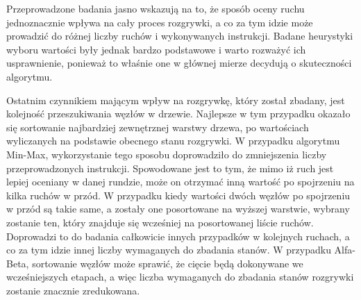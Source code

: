 \documentclass[a4paper,10pt]{article}
\begin{document}
    Przeprowadzone badania jasno wskazują na to, że sposób oceny ruchu jednoznacznie wpływa na cały proces rozgrywki, a co za tym idzie może prowadzić do różnej liczby ruchów i wykonywanych instrukcji. Badane heurystyki wyboru wartości były jednak bardzo podstawowe i warto rozważyć ich usprawnienie, ponieważ to właśnie one w głównej mierze decydują o skuteczności algorytmu.
    
    Ostatnim czynnikiem mającym wpływ na rozgrywkę, który został zbadany, jest kolejność przeszukiwania węzłów w drzewie. Najlepsze w tym przypadku okazało się sortowanie najbardziej zewnętrznej warstwy drzewa, po wartościach wyliczanych na podstawie obecnego stanu rozgrywki. W przypadku algorytmu Min-Max, wykorzystanie tego sposobu doprowadziło do zmniejszenia liczby przeprowadzonych instrukcji. Spowodowane jest to tym, że mimo iż ruch jest lepiej oceniany w danej rundzie, może on otrzymać inną wartość po spojrzeniu na kilka ruchów w przód. W przypadku kiedy wartości dwóch węzłów po spojrzeniu w przód są takie same, a zostały one posortowane na wyższej warstwie, wybrany zostanie ten, który znajduje się wcześniej na posortowanej liście ruchów. Doprowadzi to do badania całkowicie innych przypadków w kolejnych ruchach, a co za tym idzie innej liczby wymaganych do zbadania stanów. W przypadku Alfa-Beta, sortowanie węzłów może sprawić, że cięcie będą dokonywane we wcześniejszych etapach, a więc liczba wymaganych do zbadania stanów rozgrywki zostanie znacznie zredukowana.
\end{document}
